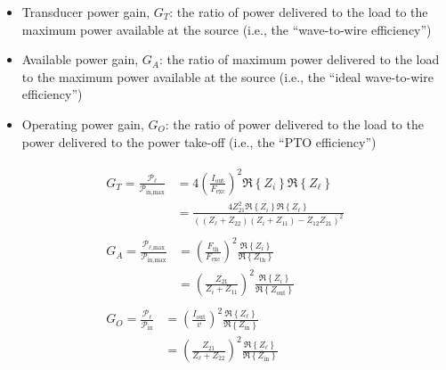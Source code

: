\documentclass[lettersize,journal]{IEEEtran}
\begin{document}
\begin{itemize}
        \item Transducer power gain, $G_T$: the ratio of power delivered to the load to the maximum power available at the source (i.e., the ``wave-to-wire efficiency'')
        \item Available power gain, $G_A$: the ratio of maximum power delivered to the load to the maximum power available at the source (i.e., the ``ideal wave-to-wire efficiency'')
        \item Operating power gain, $G_O$: the ratio of power delivered to the load to the power delivered to the power take-off (i.e., the ``PTO efficiency'')
\end{itemize}
%
\begin{subequations}
\begin{align}
        \begin{split}
                G_T = \frac{\mathcal{P}_\ell}{\mathcal{P}_{\textrm{in,max}}} &= 4\left(\frac{I_{\textrm{out}}}{F_{\textrm{exc}}}\right)^2\Re \left\{ Z_i \right\}\Re \left\{ Z_{\ell} \right\}  \\
                &= \frac{4 Z_{21}^2 \Re \left\{ Z_i \right\}\Re \left\{ Z_{\ell} \right\}}{((Z_{\ell} + Z_{22})(Z_i + Z_{11}) - Z_{12}Z_{21})^2} 
        \end{split}
        \label{eq:transducer_gain}
        \\[1em]
        \begin{split}
                G_A = \frac{\mathcal{P}_{\ell\textrm{,max}}}{\mathcal{P}_{\textrm{in,max}}}  &= \left(\frac{F_{\textrm{th}}}{F_{\textrm{exc}}}\right)^2\frac{\Re \left\{ Z_i \right\}}{\Re \left\{ Z_{\textrm{th}} \right\}} \\
                &= \left(\frac{Z_{21}}{Z_i + Z_{11}}\right)^2\frac{\Re \left\{ Z_i \right\}}{\Re \left\{ Z_{\textrm{out}} \right\}}
        \end{split}
        \label{eq:available_gain}
        \\[1em]
        \begin{split}
                G_O = \frac{\mathcal{P}_\ell}{\mathcal{P}_{\textrm{in}}}  &= \left(\frac{I_{\textrm{out}}}{v}\right)^2\frac{\Re \left\{ Z_{\ell} \right\}}{\Re \left\{ Z_{\textrm{in}} \right\}} \\
                &=  \left(\frac{Z_{21}}{Z_{\ell} + Z_{22}}\right)^2\frac{\Re \left\{ Z_{\ell} \right\}}{\Re \left\{ Z_{\textrm{in}} \right\}} 
        \end{split} \label{eq:operating_gain}
\end{align} \label{eq:gains}
\end{subequations}
\end{document}
